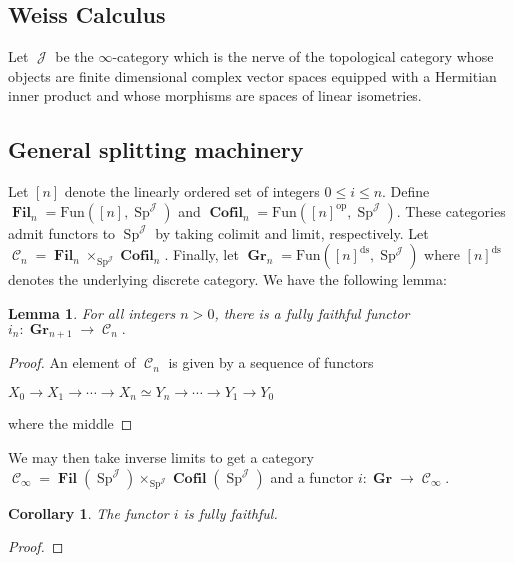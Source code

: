 \documentclass[reqno, oneside]{amsart}
\theoremstyle{definition}
\theoremstyle{plain}
\newtheorem{lem}[nul]{Lemma}
\newtheorem{cor}{Corollary}[nul]
\DeclareMathOperator{\C}{\mathcal{C}}
\DeclareMathOperator{\Gr}{\textbf{Gr}}
\DeclareMathOperator{\Fil}{\textbf{Fil}}
\DeclareMathOperator{\Sp}{\text{Sp}}
\DeclareMathOperator{\J}{\mathcal{J}}
\DeclareMathOperator{\Cofil}{\textbf{Cofil}}
\begin{document}
\subsection{Weiss Calculus}
Let $\J$ be the $\infty$-category which is the nerve of the topological category whose objects are finite dimensional complex vector spaces equipped with a Hermitian inner product and whose morphisms are spaces of linear isometries.  


\subsection{General splitting machinery}


Let $[n]$ denote the linearly ordered set of integers $0\leq i\leq n$.  Define $\Fil_n = \text{Fun}([n], \Sp^{\J})$ and $\Cofil_n = \text{Fun}([n]^{\text{op}},\Sp^{\J})$.  These categories admit functors to $\Sp^{\J}$ by taking colimit and limit, respectively.  Let $\C_n = \Fil_n \times_{\Sp^{\J}} \Cofil_n.$  Finally, let $\Gr_n = \text{Fun}([n]^{\text{ds}}, \Sp^{\J})$ where $[n]^{\text{ds}}$ denotes the underlying discrete category.  We have the following lemma:

\begin{lem}
For all integers $n>0$, there is a fully faithful functor $i_n:\Gr_{n+1} \to \C_n.$  
\end{lem}
\begin{proof}
An element of $\C_n$ is given by a sequence of functors 
\begin{center}
$X_0 \longrightarrow X_1 \longrightarrow \cdots \longrightarrow X_n \simeq Y_n \longrightarrow \cdots \longrightarrow Y_1 \longrightarrow Y_0$ 
\end{center}
where the middle 
\end{proof}

We may then take inverse limits to get a category $\C_\infty = \Fil(\Sp^{\J}) \times_{\Sp^{\J}} \Cofil(\Sp^{\J})$ and a functor $i: \Gr \to \C_\infty$. 

\begin{cor}
The functor $i$ is fully faithful.
\end{cor}
\begin{proof}
\end{proof}
\end{document}
